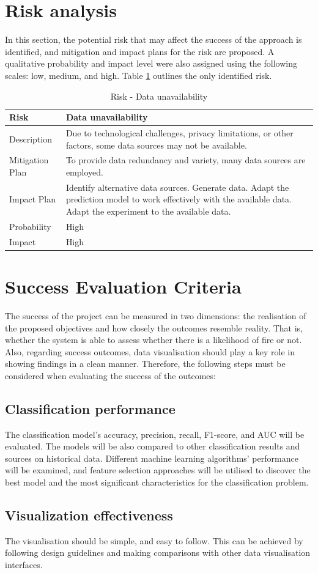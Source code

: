 \section{Risk analysis}
In this section, the potential risk that may affect the success of the approach is identified, and mitigation and impact plans for the risk are proposed. A qualitative probability and impact level were also assigned using the following scales: low, medium, and high. Table \ref{risk_du} outlines the only identified risk.

\begin{table}[h!]
\caption{Risk - Data unavailability}
\label{risk_du}
\begin{tabular}{|p{2cm}|p{12cm}|}
\hline
Risk            & Data unavailability \\ \hline
Description     & Due to technological challenges, privacy limitations, or other factors, some data sources may not be available. \\ \hline
Mitigation Plan & To provide data redundancy and variety, many data sources are employed.  \\ \hline
Impact Plan     & Identify alternative data sources. Generate data. Adapt the prediction model to work effectively with the available data. Adapt the experiment to the available data. \\ \hline
Probability     & High \\ \hline
Impact          & High \\ \hline
\end{tabular}
\end{table}


\section{Success Evaluation Criteria}
The success of the project can be measured in two dimensions: the realisation of the proposed objectives and how closely the outcomes resemble reality. That is, whether the system is able to assess whether there is a likelihood of fire or not. Also, regarding success outcomes, data visualisation should play a key role in showing findings in a clean manner. Therefore, the following steps must be considered when evaluating the success of the outcomes:

\subsection{Classification performance}
The classification model's accuracy, precision, recall, F1-score, and AUC will be evaluated. The models will be also compared to other classification results and sources on historical data. 
Different machine learning algorithms' performance will be examined, and feature selection approaches will be utilised to discover the best model and the most significant characteristics for the classification problem.


\subsection{Visualization effectiveness}
The visualisation should be simple, and easy to follow. This can be achieved by following design guidelines and making comparisons with other data visualisation interfaces. 


